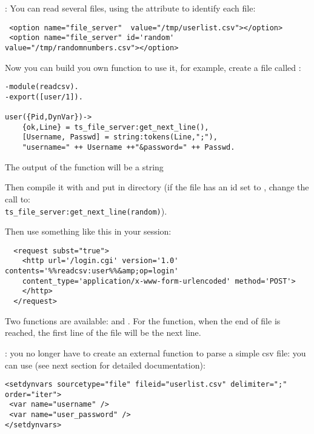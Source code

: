 \documentclass{TSUNG-en}
\begin{document}
: You can read several files, using the 
attribute to identify each file:
\begin{Verbatim}
 <option name="file_server"  value="/tmp/userlist.csv"></option>
 <option name="file_server" id='random' value="/tmp/randomnumbers.csv"></option>
\end{Verbatim}

Now you can build you own function to use it, for example, create a
file called :

\begin{Verbatim}
-module(readcsv).
-export([user/1]).

user({Pid,DynVar})->
    {ok,Line} = ts_file_server:get_next_line(),
    [Username, Passwd] = string:tokens(Line,";"),
    "username=" ++ Username ++"&password=" ++ Passwd.
\end{Verbatim}

The output of the function will be a string 

Then compile it with  and put
 in
 directory  (if the
file has an id set to , change the call to: \\
\texttt{ts\_file\_server:get\_next\_line(random)}).

Then use something like this in your session:

\begin{Verbatim}
  <request subst="true">
    <http url='/login.cgi' version='1.0' contents='%%readcsv:user%%&amp;op=login'
    content_type='application/x-www-form-urlencoded' method='POST'>
    </http>
  </request>
\end{Verbatim}

Two functions are available: 
and . For the
 function, when the end of file is reached, the
first line of the file will be the next line.

: you no longer have to create an external
function to parse a simple csv file: you can use 
(see next section for detailed documentation):

\begin{Verbatim}
<setdynvars sourcetype="file" fileid="userlist.csv" delimiter=";" order="iter">
 <var name="username" />
 <var name="user_password" />
</setdynvars>
\end{Verbatim}
\end{document}

